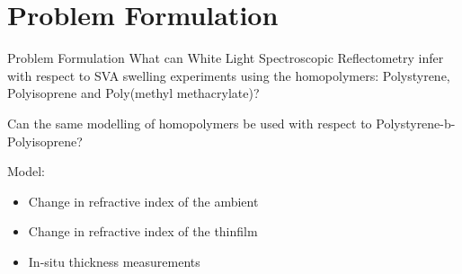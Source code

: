 \documentclass[10pt]{beamer}
\begin{document}
	\section{Problem Formulation}
	\begin{frame}{Problem Formulation}
	What can White Light Spectroscopic Reflectometry infer with respect to SVA swelling experiments using the homopolymers: Polystyrene, Polyisoprene and Poly(methyl methacrylate)? 
	
	Can the same modelling of homopolymers be used with respect to Polystyrene-b-Polyisoprene?
	
	Model:
	\begin{itemize}
	\item Change in refractive index of the ambient 
	\item Change in refractive index of the thinfilm
	\item In-situ thickness measurements
	\end{itemize}  
	\end{frame}
	

	
\end{document}
